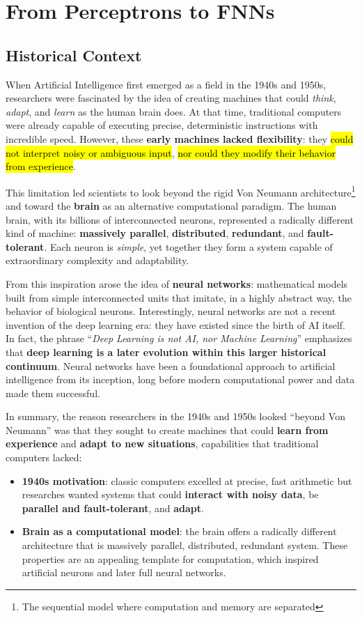 \section{From Perceptrons to FNNs}

\subsection{Historical Context}

When Artificial Intelligence first emerged as a field in the 1940s and 1950s, researchers were fascinated by the idea of creating machines that could \emph{think}, \emph{adapt}, and \emph{learn} as the human brain does. At that time, traditional computers were already capable of executing precise, deterministic instructions with incredible speed. However, these \textbf{early machines lacked flexibility}: they \hl{could not interpret noisy or ambiguous input}, \hl{nor could they modify their behavior from experience}.

\highspace
This limitation led scientists to look beyond the rigid Von Neumann architecture\footnote{The sequential model where computation and memory are separated} and toward the \textbf{brain} as an alternative computational paradigm. The human brain, with its billions of interconnected neurons, represented a radically different kind of machine: \textbf{massively parallel}, \textbf{distributed}, \textbf{redundant}, and \textbf{fault-tolerant}. Each neuron is \emph{simple}, yet together they form a system capable of extraordinary complexity and adaptability.

\highspace
From this inspiration arose the idea of \textbf{neural networks}: mathematical models built from simple interconnected units that imitate, in a highly abstract way, the behavior of biological neurons. Interestingly, neural networks are not a recent invention of the deep learning era: they have existed since the birth of AI itself. In fact, the phrase ``\emph{Deep Learning is not AI, nor Machine Learning}'' emphasizes that \textbf{deep learning is a later evolution within this larger historical continuum}. Neural networks have been a foundational approach to artificial intelligence from its inception, long before modern computational power and data made them successful.

\highspace
In summary, the reason researchers in the 1940s and 1950s looked ``beyond Von Neumann'' was that they sought to create machines that could \textbf{learn from experience} and \textbf{adapt to new situations}, capabilities that traditional computers lacked:
\begin{itemize}
    \item \textbf{1940s motivation}: classic computers excelled at precise, fast arithmetic but researches wanted systems that could \textbf{interact with noisy data}, be \textbf{parallel and fault-tolerant}, and \textbf{adapt}.
    \item \textbf{Brain as a computational model}: the brain offers a radically different architecture that is massively parallel, distributed, redundant system. These properties are an appealing template for computation, which inspired artificial neurons and later full neural networks.
\end{itemize}

